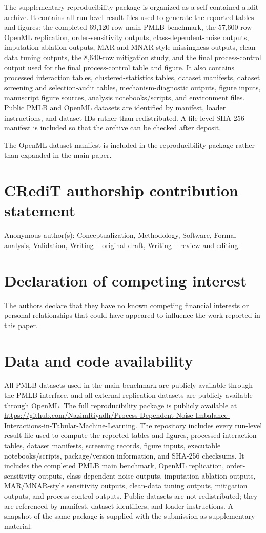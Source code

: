 \documentclass[preprint,12pt,number]{elsarticle}
\begin{document}
The supplementary reproducibility package is organized as a self-contained audit archive. It contains all run-level result files used to generate the reported tables and figures: the completed 69,120-row main PMLB benchmark, the 57,600-row OpenML replication, order-sensitivity outputs, class-dependent-noise outputs, imputation-ablation outputs, MAR and MNAR-style missingness outputs, clean-data tuning outputs, the 8,640-row mitigation study, and the final process-control output used for the final process-control table and figure. It also contains processed interaction tables, clustered-statistics tables, dataset manifests, dataset screening and selection-audit tables, mechanism-diagnostic outputs, figure inputs, manuscript figure sources, analysis notebooks/scripts, and environment files. Public PMLB and OpenML datasets are identified by manifest, loader instructions, and dataset IDs rather than redistributed. A file-level SHA-256 manifest is included so that the archive can be checked after deposit.

The OpenML dataset manifest is included in the reproducibility package rather than expanded in the main paper.

\section*{CRediT authorship contribution statement}
Anonymous author(s): Conceptualization, Methodology, Software, Formal analysis, Validation, Writing -- original draft, Writing -- review and editing.

\section*{Declaration of competing interest}
The authors declare that they have no known competing financial interests or personal relationships that could have appeared to influence the work reported in this paper.

\section*{Data and code availability}
All PMLB datasets used in the main benchmark are publicly available through the PMLB interface, and all external replication datasets are publicly available through OpenML. The full reproducibility package is publicly available at \url{https://github.com/NazimRiyadh/Process-Dependent-Noise-Imbalance-Interactions-in-Tabular-Machine-Learning}. The repository includes every run-level result file used to compute the reported tables and figures, processed interaction tables, dataset manifests, screening records, figure inputs, executable notebooks/scripts, package/version information, and SHA-256 checksums. It includes the completed PMLB main benchmark, OpenML replication, order-sensitivity outputs, class-dependent-noise outputs, imputation-ablation outputs, MAR/MNAR-style sensitivity outputs, clean-data tuning outputs, mitigation outputs, and process-control outputs. Public datasets are not redistributed; they are referenced by manifest, dataset identifiers, and loader instructions. A snapshot of the same package is supplied with the submission as supplementary material.
\end{document}
